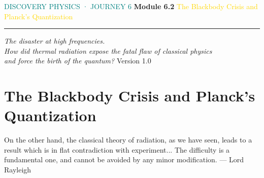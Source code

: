 \documentclass[12pt, a4paper, twoside]{book}
\begin{document}
\begin{titlepage}
\pagecolor{deep}\color{white}\centering\vspace*{1.8cm}


\vspace{0.8cm}
{\fontsize{11}{14}\selectfont\textcolor{teal}{\MakeUppercase{Discovery Physics · Journey 6}}}
\vspace{0.3cm}
{\fontsize{34}{40}\selectfont\bfseries Module 6.2}
\vspace{0.3cm}
{\fontsize{20}{26}\selectfont\textcolor{gold}{%
The Blackbody Crisis and\\
Planck's Quantization}}
\vspace{0.5cm}
\textcolor{white!60}{\rule{8cm}{0.4pt}}
\vspace{0.4cm}
{\fontsize{12}{18}\selectfont\textcolor{white!80}{\itshape
The disaster at high frequencies.\\[4pt]
How did thermal radiation expose the fatal flaw of classical physics\\
and force the birth of the quantum?}}
\vfill\textcolor{white!30}{\small Version 1.0}
\end{titlepage}
\nopagecolor
\tableofcontents

\chapter{The Blackbody Crisis and Planck's Quantization}

\begin{epigraph}
{On the other hand, the classical theory of radiation, as we have seen, leads to a result which is in flat contradiction with experiment... The difficulty is a fundamental one, and cannot be avoided by any minor modification.}
{--- Lord Rayleigh}
\end{epigraph}
\end{document}
